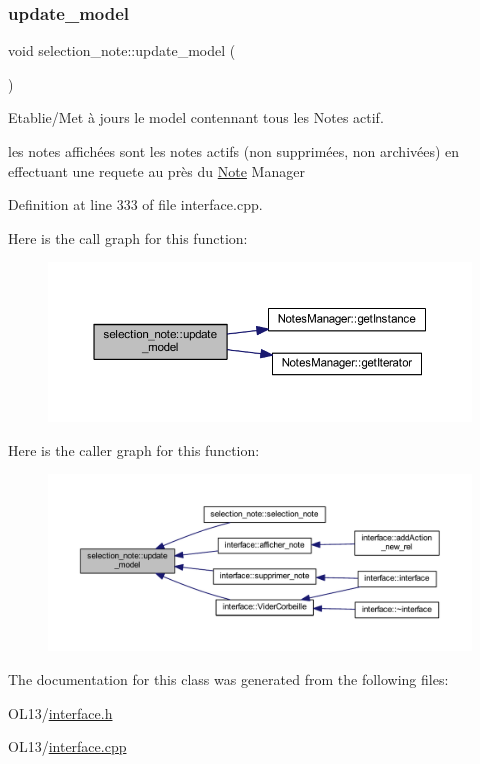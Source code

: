 \subsubsection{\texorpdfstring{update\+\_\+model}{update\_model}}
{\footnotesize\ttfamily void selection\+\_\+note\+::update\+\_\+model (\begin{DoxyParamCaption}{ }\end{DoxyParamCaption})\hspace{0.3cm}{\ttfamily [slot]}}



Etablie/\+Met à jours le model contennant tous les Notes actif. 

les notes affichées sont les notes actifs (non supprimées, non archivées) en effectuant une requete au près du \hyperlink{class_note}{Note} Manager 

Definition at line 333 of file interface.\+cpp.

Here is the call graph for this function\+:\nopagebreak
\begin{figure}[H]
\begin{center}
\leavevmode
\includegraphics[width=350pt]{classselection__note_aab004424eba4264628d2e01108f2e63b_cgraph}
\end{center}
\end{figure}
Here is the caller graph for this function\+:\nopagebreak
\begin{figure}[H]
\begin{center}
\leavevmode
\includegraphics[width=350pt]{classselection__note_aab004424eba4264628d2e01108f2e63b_icgraph}
\end{center}
\end{figure}


The documentation for this class was generated from the following files\+:\begin{DoxyCompactItemize}
\item 
O\+L13/\hyperlink{interface_8h}{interface.\+h}\item 
O\+L13/\hyperlink{interface_8cpp}{interface.\+cpp}\end{DoxyCompactItemize}
